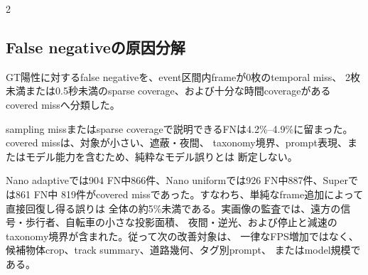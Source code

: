 \documentclass[9pt,a4paper]{extarticle}
\begin{document}
\begin{multicols}{2}
\subsection{False negativeの原因分解}
GT陽性に対するfalse negativeを、event区間内frameが0枚のtemporal miss、
2枚未満または0.5秒未満のsparse coverage、および十分な時間coverageがある
covered missへ分類した。
\begin{center}
\label{tab:error-analysis}
\scriptsize
{}
\end{center}
sampling missまたはsparse coverageで説明できるFNは4.2\%--4.9\%に留まった。covered missは、対象が小さい、遮蔽・夜間、
taxonomy境界、prompt表現、またはモデル能力を含むため、純粋なモデル誤りとは
断定しない。

Nano adaptiveでは904 FN中866件、Nano uniformでは926 FN中887件、Superでは861 FN中
819件がcovered missであった。すなわち、単純なframe追加によって直接回復し得る誤りは
全体の約5\%未満である。実画像の監査では、遠方の信号・歩行者、自転車の小さな投影面積、
夜間・逆光、および停止と減速のtaxonomy境界が含まれた。従って次の改善対象は、
一律なFPS増加ではなく、候補物体crop、track summary、道路幾何、タグ別prompt、
またはmodel規模である。

\end{multicols}
\end{document}
